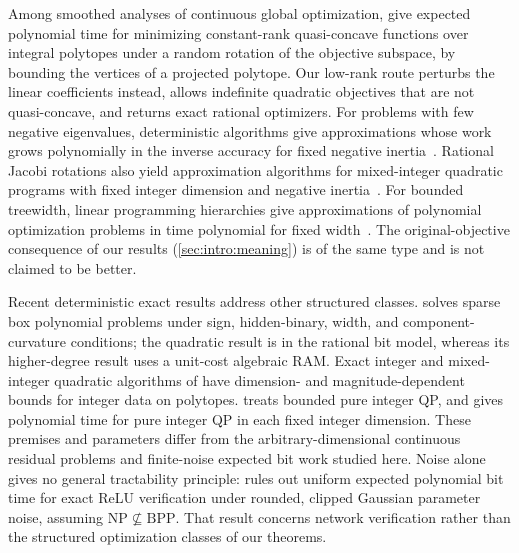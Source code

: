 Among smoothed analyses of continuous global optimization,
\citet{kelner2007-on-the-hardness-and-smoothed} give expected polynomial time for minimizing
constant-rank quasi-concave functions over integral polytopes under a random
rotation of the objective subspace, by bounding the vertices of a projected
polytope. Our low-rank route perturbs the linear coefficients instead,
allows indefinite quadratic objectives that are not quasi-concave, and
returns exact rational optimizers. For problems with few negative
eigenvalues, deterministic algorithms give approximations whose work grows
polynomially in the inverse accuracy for fixed negative inertia~\citep{vavasis1992-approximation-algorithms-for-indefinite-quadratic}.
Rational Jacobi rotations also yield approximation algorithms for
mixed-integer quadratic programs with fixed integer dimension and negative
inertia~\citep{pia2026-rational-jacobi-rotations-and-the}.
For bounded treewidth, linear programming hierarchies give approximations of
polynomial optimization problems in time polynomial for fixed
width~\citep{bienstock2018-lp-formulations-for-polynomial-optimization}. The original-objective consequence of our
results (\cref{sec:intro:meaning}) is of the same type and is not claimed to
be better.

Recent deterministic exact results address other structured classes.
\citet{khajavirad2026-a-polynomial-time-solvable-class} solves sparse box
polynomial problems under sign, hidden-binary, width, and component-curvature
conditions; the quadratic result is in the rational bit model, whereas its
higher-degree result uses a unit-cost algebraic RAM. Exact integer and
mixed-integer quadratic algorithms of
\citet{ari2026-curvature-batching-for-integer-and} have
dimension- and magnitude-dependent bounds for integer data on polytopes.
\citet{ari2026-bounded-integer-quadratic-programming-through} treats bounded
pure integer QP, and \citet{wei2026-integer-quadratic-programming-in-fixed}
gives polynomial time for pure integer QP in each fixed integer dimension.
These premises and parameters differ from the arbitrary-dimensional
continuous residual problems and finite-noise expected bit work studied
here. Noise alone gives no general tractability principle:
\citet{soltanalian2026-random-parameter-noise-does-not} rules out uniform
expected polynomial bit time for exact ReLU verification under rounded,
clipped Gaussian parameter noise, assuming $\mathrm{NP}\nsubseteq\mathrm{BPP}$.
That result concerns network verification rather than the structured
optimization classes of our theorems.

